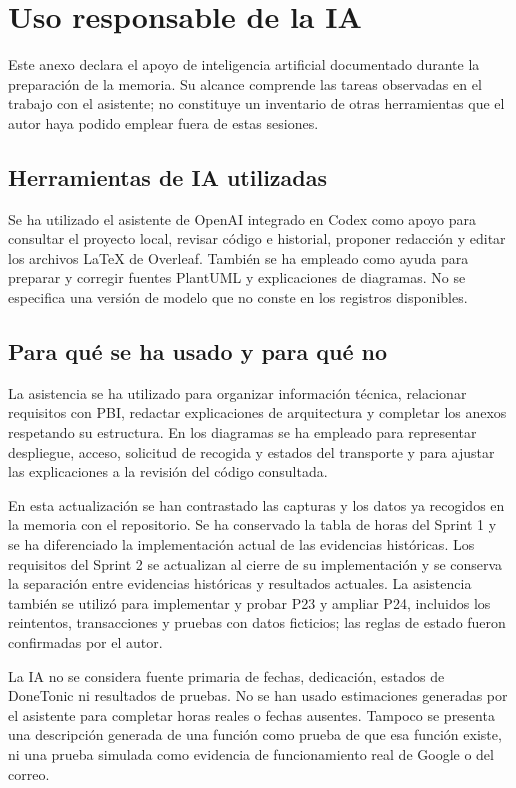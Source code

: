 \chapter{Uso responsable de la IA}
\label{anexo:uso-ia}
Este anexo declara el apoyo de inteligencia artificial documentado durante la preparación de la memoria. Su alcance comprende las tareas observadas en el trabajo con el asistente; no constituye un inventario de otras herramientas que el autor haya podido emplear fuera de estas sesiones.

\section{Herramientas de IA utilizadas}
Se ha utilizado el asistente de OpenAI integrado en Codex como apoyo para consultar el proyecto local, revisar código e historial, proponer redacción y editar los archivos LaTeX de Overleaf. También se ha empleado como ayuda para preparar y corregir fuentes PlantUML y explicaciones de diagramas. No se especifica una versión de modelo que no conste en los registros disponibles.

\section{Para qué se ha usado y para qué no}
La asistencia se ha utilizado para organizar información técnica, relacionar requisitos con PBI, redactar explicaciones de arquitectura y completar los anexos respetando su estructura. En los diagramas se ha empleado para representar despliegue, acceso, solicitud de recogida y estados del transporte y para ajustar las explicaciones a la revisión del código consultada.

En esta actualización se han contrastado las capturas y los datos ya recogidos en la memoria con el repositorio. Se ha conservado la tabla de horas del Sprint 1 y se ha diferenciado la implementación actual de las evidencias históricas. Los requisitos del Sprint 2 se actualizan al cierre de su implementación y se conserva la separación entre evidencias históricas y resultados actuales. La asistencia también se utilizó para implementar y probar P23 y ampliar P24, incluidos los reintentos, transacciones y pruebas con datos ficticios; las reglas de estado fueron confirmadas por el autor.

La IA no se considera fuente primaria de fechas, dedicación, estados de DoneTonic ni resultados de pruebas. No se han usado estimaciones generadas por el asistente para completar horas reales o fechas ausentes. Tampoco se presenta una descripción generada de una función como prueba de que esa función existe, ni una prueba simulada como evidencia de funcionamiento real de Google o del correo.

